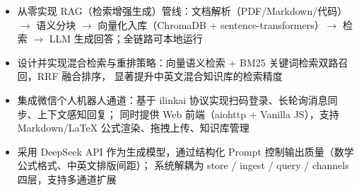 \begin{onehalfspacing}
\begin{itemize}
    \item 从零实现 RAG（检索增强生成）管线：文档解析（PDF/Markdown/代码）$\to$ 语义分块 $\to$
      向量化入库（ChromaDB + sentence-transformers）$\to$ 检索 $\to$ LLM 生成回答；全链路可本地运行
    \item 设计并实现混合检索与重排策略：向量语义检索 + BM25 关键词检索双路召回，RRF 融合排序，
      显著提升中英文混合知识库的检索精度
    \item 集成微信个人机器人通道：基于 ilinkai 协议实现扫码登录、长轮询消息同步、上下文感知回复；
      同时提供 Web 前端（aiohttp + Vanilla JS），支持 Markdown/LaTeX 公式渲染、拖拽上传、知识库管理
    \item 采用 DeepSeek API 作为生成模型，通过结构化 Prompt 控制输出质量（数学公式格式、中英文排版间距）；
      系统解耦为 store / ingest / query / channels 四层，支持多通道扩展
\end{itemize}
\end{onehalfspacing}
